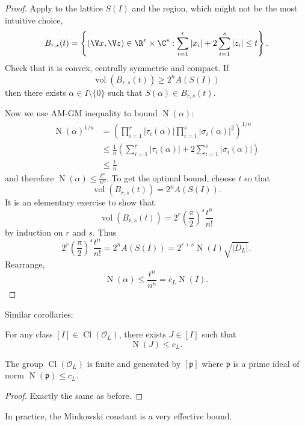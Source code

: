 \documentclass[a4paper]{article}
\renewcommand*{\O}{\mathcal{O}}
\DeclareMathOperator{\n}{N}
\DeclareMathOperator{\Cl}{Cl} %
\DeclareMathOperator{\vol}{vol}
\begin{document}
\begin{proof}
  Apply  to the lattice \(S(I)\) and the region, which might not be the most intuitive choice,
  \[
    B_{r, s}(t) = \left\{ (\V x, \V z) \in \R^r \times \C^s: \sum_{i = 1}^r |x_i| + 2 \sum_{i = 1}^s |z_i| \leq t \right\}.
  \]
  Check that it is convex, centrally symmetric and compact. If
  \[
    \vol(B_{r, s}(t)) \geq 2^n A(S(I))
  \]
  then there exists \(\alpha \in I \setminus \{0\}\) such that \(S(\alpha) \in B_{r, s}(t)\).

  Now we use AM-GM inequality to bound \(\n(\alpha)\):
  \begin{align*}
    \n(\alpha)^{1/n}
    &= \left( \prod_{i = 1}^r |\tau_i(\alpha)| \prod_{i = 1}^s |\sigma_i(\alpha)|^2 \right)^{1/n} \\
    &\leq \frac{1}{n} \left( \sum_{i = 1}^r |\tau_i(\alpha)| + 2 \sum_{i = 1}^s |\sigma_i(\alpha)| \right) \\
    &\leq \frac{t}{n}
  \end{align*}
  and therefore \(\n(\alpha) \leq \frac{t^n}{n^n}\). To get the optimal bound, choose \(t\) so that
  \[
    \vol(B_{r, s}(t)) = 2^nA(S(I)).
  \]
  It is an elementary exercise to show that
  \[
    \vol(B_{r, s}(t)) = 2^r \left( \frac{\pi}{2} \right)^s \frac{t^n}{n!}
  \]
  by induction on \(r\) and \(s\). Thus
  \[
    2^r \left( \frac{\pi}{2} \right)^s \frac{t^n}{n!} = 2^n A(S(I)) = 2^{r + s} \n(I) \sqrt{|D_L|}.
  \]
  Rearrange,
  \[
    \n(\alpha) \leq \frac{t^n}{n^n} = c_L \n(I).
  \]
\end{proof}

Similar corollaries:

\begin{corollary}
  For any class \([I] \in \Cl(\O_L)\), there exists \(J \in [I]\) such that
  \[
    \n(J) \leq c_L.
  \]
\end{corollary}

\begin{corollary}
  The group \(\Cl(\O_L)\) is finite and generated by \([\mathfrak{p}]\) where \(\mathfrak{p}\) is a prime ideal of norm \(\n(\mathfrak{p}) \leq c_L\).
\end{corollary}

\begin{proof}
  Exactly the same as before.
\end{proof}

\begin{remark}
  In practice, the Minkowski constant is a very effective bound.
\end{remark}
\end{document}
